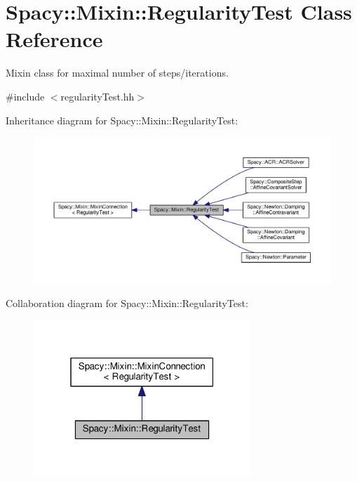 \hypertarget{classSpacy_1_1Mixin_1_1RegularityTest}{}\section{Spacy\+:\+:Mixin\+:\+:Regularity\+Test Class Reference}
\label{classSpacy_1_1Mixin_1_1RegularityTest}


Mixin class for maximal number of steps/iterations.  




{\ttfamily \#include $<$regularity\+Test.\+hh$>$}



Inheritance diagram for Spacy\+:\+:Mixin\+:\+:Regularity\+Test\+:
\nopagebreak
\begin{figure}[H]
\begin{center}
\leavevmode
\includegraphics[width=350pt]{classSpacy_1_1Mixin_1_1RegularityTest__inherit__graph}
\end{center}
\end{figure}


Collaboration diagram for Spacy\+:\+:Mixin\+:\+:Regularity\+Test\+:
\nopagebreak
\begin{figure}[H]
\begin{center}
\leavevmode
\includegraphics[width=232pt]{classSpacy_1_1Mixin_1_1RegularityTest__coll__graph}
\end{center}
\end{figure}

